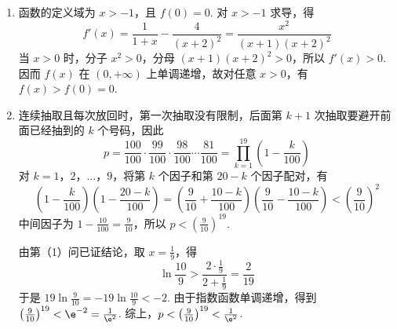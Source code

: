 \begin{solution}
\begin{enumerate}
\item 函数的定义域为 \(x>-1\)，且 \(f(0)=0\). 对 \(x>-1\) 求导，得
\[
f'(x)=\frac1{1+x}-\frac4{(x+2)^2}=\frac{x^2}{(x+1)(x+2)^2}
\]
当 \(x>0\) 时，分子 \(x^2>0\)，分母 \((x+1)(x+2)^2>0\)，所以 \(f'(x)>0\). 因而 \(f(x)\) 在 \((0,+\infty)\) 上单调递增，故对任意 \(x>0\)，有 \(f(x)>f(0)=0\).

\item 连续抽取且每次放回时，第一次抽取没有限制，后面第 \(k+1\) 次抽取要避开前面已经抽到的 \(k\) 个号码，因此
\[
p=\frac{100}{100}\cdot\frac{99}{100}\cdot\frac{98}{100}\cdots\frac{81}{100}=\prod_{k=1}^{19}\left(1-\frac{k}{100}\right)
\]
对 \(k=1\)，\(2\)，\(\ldots\)，\(9\)，将第 \(k\) 个因子和第 \(20-k\) 个因子配对，有
\[
\left(1-\frac{k}{100}\right)\left(1-\frac{20-k}{100}\right)
=\left(\frac9{10}+\frac{10-k}{100}\right)\left(\frac9{10}-\frac{10-k}{100}\right)<\left(\frac9{10}\right)^2
\]
中间因子为 \(1-\frac{10}{100}=\frac9{10}\)，所以 \(p<\left(\frac9{10}\right)^{19}\).

由第（1）问已证结论，取 \(x=\frac19\)，得
\[
\ln\frac{10}{9}>\frac{2\cdot\frac19}{2+\frac19}=\frac2{19}
\]
于是 \(19\ln\frac9{10}=-19\ln\frac{10}{9}<-2\). 由于指数函数单调递增，得到 \(\left(\frac9{10}\right)^{19}<\e^{-2}=\frac1{\e^2}\). 综上，\(p < \left(\frac9{10}\right)^{19} < \frac1{\e^2}\).
\end{enumerate}
\end{solution}
